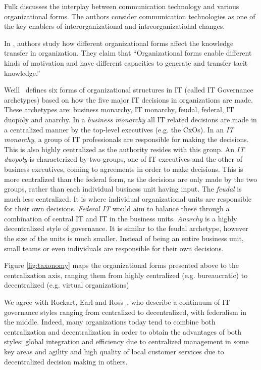 Fulk \cite{fulk1995} discusses the interplay between communication technology and various organizational forms. The authors consider communication technologies as one of the key enablers of interorganizational and intreorganizatiohal changes.

In \cite{osterloh2000}, authors study how different organizational forms affect the knowledge transfer in organization. They claim that ``Organizational forms enable different kinds of motivation and have different capacities to generate and transfer tacit knowledge.''

Weill~\cite{Weill2004} defines six forms of organizational structures in IT (called IT Governance archetypes) based on how the five major IT decisions in organizations are made. These archetypes are: business monarchy, IT monarchy, feudal, federal, IT duopoly and anarchy.   In a \textit{business monarchy} all IT related decisions are made in a centralized manner by the top-level executives (e.g. the CxOs). In an \textit{IT monarchy}, a group of IT professionals are responsible for making the decisions. This is also highly centralized as the authority resides with this group. An \textit{IT duopoly} is characterized by two groups, one of IT executives and the other of business executives, coming to agreements in order to make decisions. This is more centralized than the federal form, as the decisions are only made by the two groups, rather than each individual business unit having input. The \textit{feudal} is much less centralized. It is where individual organizational units are responsible for their own decisions. \textit{Federal IT  }would aim to balance these through a combination of central IT and IT in the business units. \textit{Anarchy} is a highly decentralized style of governance. It is similar to the feudal archetype, however the size of the units is much smaller. Instead of being an entire business unit, small teams or even individuals are responsible for their own decisions.

Figure \ref{fig:taxonomy} maps the organizational forms presented above to the centralization axis, ranging them from highly centralized (e.g. bureaucratic) to decentralized (e.g. virtual organizations)

We agree with Rockart, Earl and Ross~\cite{Rockart1996}, who describe a continuum of IT governance styles ranging from centralized to decentralized, with federalism in the middle. Indeed, many organizations today tend to combine both centralization and decentralization in order to obtain the advantages of both styles: global integration and efficiency due to centralized management in some key areas and agility and high quality of local customer services due to decentralized decision making in others. 

